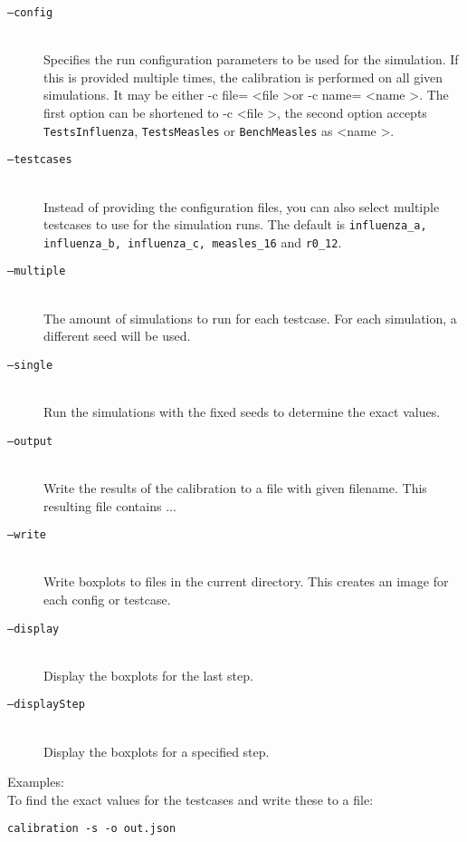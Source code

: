 \begin{description}
    \item[\texttt{--config}] \ \\
        Specifies the run configuration parameters to be used for the simulation.
        If this is provided multiple times, the calibration is performed on all given simulations.
        It may be either -c file= \textless file \textgreater or -c name= \textless name \textgreater .
        The first option can be shortened to -c \textless file \textgreater , the second option accepts \texttt{TestsInfluenza}, \texttt{TestsMeasles} or \texttt{BenchMeasles} as  \textless name \textgreater .
    \item[\texttt{--testcases}] \ \\
        Instead of providing the configuration files, you can also select multiple testcases to use for the simulation runs.
        The default is \texttt{influenza\_a, influenza\_b, influenza\_c, measles\_16} and \texttt{r0\_12}.
    \item[\texttt{--multiple}]\ \\
        The amount of simulations to run for each testcase. For each simulation, a different seed will be used.
    \item[\texttt{--single}]\ \\
        Run the simulations with the fixed seeds to determine the exact values.
    \item[\texttt{--output}]\ \\
        Write the results of the calibration to a file with given filename. This resulting file contains ...
    \item[\texttt{--write}]\ \\
        Write boxplots to files in the current directory. This creates an image for each config or testcase.
    \item[\texttt{--display}]\ \\
        Display the boxplots for the last step.
    \item[\texttt{--displayStep}]\ \\
        Display the boxplots for a specified step.
\end{description}

Examples:\\
To find the exact values for the testcases and write these to a file:\\

\centerline{\texttt{calibration -s -o out.json}}


